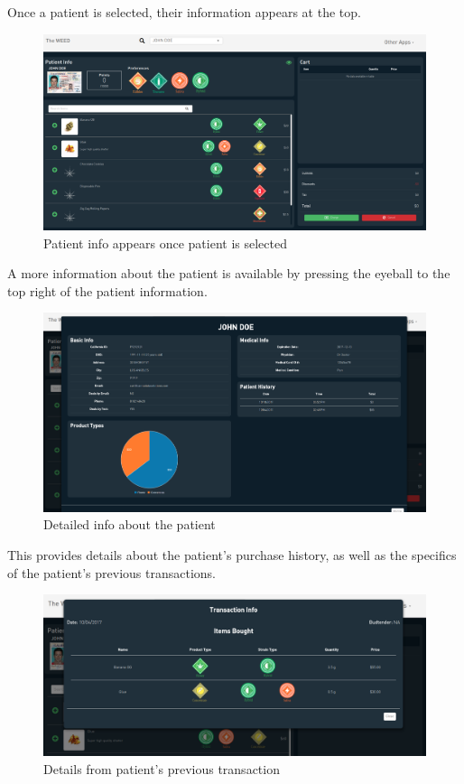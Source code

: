 \documentclass[]{book}
\theoremstyle{definition}
\theoremstyle{definition}
\theoremstyle{definition}
\theoremstyle{remark}
\begin{document}
Once a patient is selected, their information appears at the top.

\begin{figure}
\centering
\includegraphics{images/P2.png}
\caption{Patient info appears once patient is selected}
\end{figure}

A more information about the patient is available by pressing the
eyeball to the top right of the patient information.

\begin{figure}
\centering
\includegraphics{images/P3.png}
\caption{Detailed info about the patient}
\end{figure}

This provides details about the patient's purchase history, as well as
the specifics of the patient's previous transactions.

\begin{figure}
\centering
\includegraphics{images/P4.png}
\caption{Details from patient's previous transaction}
\end{figure}
\end{document}
